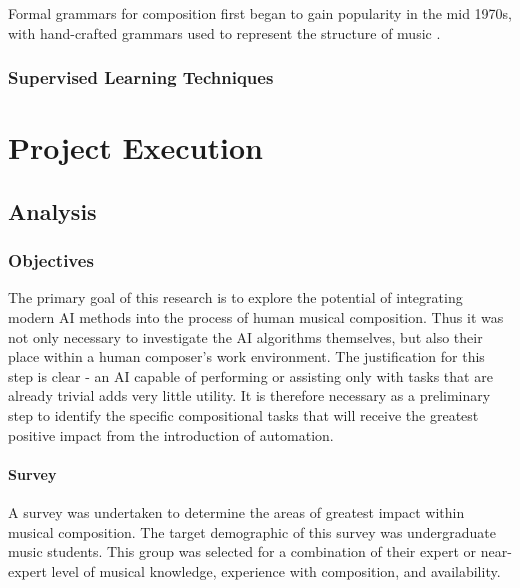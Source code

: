 \documentclass[ author={Stephen Livermore-Tozer},
				supervisor={Dr. Peter Flach},
				degree={MEng},
				title={Performing Algorithmic Co-composition Using Machine Learning},
				subtitle={},
				type={research},
				year={2016} ]{dissertation}
\begin{document}
	Formal grammars for composition first began to gain popularity in the mid 1970s, with hand-crafted grammars used to represent the structure of music \cite{lidov1973melody}\cite{rader1974method}. 
	
	\subsection{Supervised Learning Techniques}
	\label{sec:supervised-techniques}
	
	
	\chapter{Project Execution}
	\label{chap:execution}
	
	\section{Analysis}
	
	\subsection{Objectives}
	
	The primary goal of this research is to explore the potential of integrating modern AI methods into the process of human musical composition. Thus it was not only necessary to investigate the AI algorithms themselves, but also their place within a human composer's work environment. The justification for this step is clear - an AI capable of performing or assisting only with tasks that are already trivial adds very little utility. It is therefore necessary as a preliminary step to identify the specific compositional tasks that will receive the greatest positive impact from the introduction of automation.
	
	\subsubsection{Survey}
	
	
	A survey was undertaken to determine the areas of greatest impact within musical composition. The target demographic of this survey was undergraduate music students. This group was selected for a combination of their expert or near-expert level of musical knowledge, experience with composition, and availability. 
	
\end{document}
